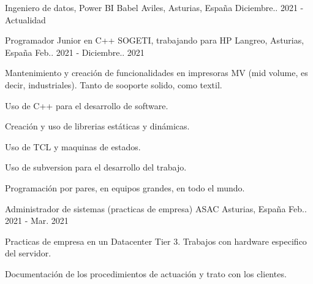 

\begin{cventries}

    \cventry
    {Ingeniero de datos, Power BI} %
    {Babel} %
    {Aviles, Asturias, España} %
    {Diciembre.. 2021 - Actualidad} %
    {
        \begin{cvitems} %
        \end{cvitems}
    }

    \cventry
    {Programador Junior en C++} %
    {SOGETI, trabajando para HP} %
    {Langreo, Asturias, España} %
    {Feb.. 2021 - Diciembre.. 2021} %
    {
        \begin{cvitems} %
            \item {Mantenimiento y creación de funcionalidades en impresoras MV (mid volume, es decir, industriales).
                        Tanto de sooporte solido, como textil.}
            \item {Uso de C++ para el desarrollo de software.}
            \item {Creación y uso de librerias estáticas y dinámicas.}
            \item {Uso de TCL y maquinas de estados.}
            \item {Uso de subversion para el desarrollo del trabajo.}
            \item {Programación por pares, en equipos grandes, en todo el mundo.}
        \end{cvitems}
    }

    \cventry
    {Administrador de sistemas (practicas de empresa)} %
    {ASAC} %
    {Asturias, España} %
    {Feb.. 2021 - Mar. 2021} %
    {
        \begin{cvitems} %
            \item {Practicas de empresa en un Datacenter Tier 3. Trabajos con hardware especifico del servidor.}
            \item {Documentación de los procedimientos de actuación y trato con los clientes.}
        \end{cvitems}
    }


\end{cventries}
